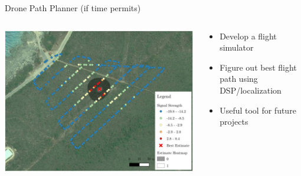 \begin{frame}{Drone Path Planner (if time permits)}
    \begin{columns}
        \begin{column}{0.5\textwidth}
            \includegraphics[height=0.7\textheight,width=\textwidth,keepaspectratio]{images/rtt/rob22017-fig-0005-m.jpg}
        \end{column}
        \begin{column}{0.5\textwidth}
            \begin{itemize}
                \item Develop a flight simulator
                \item Figure out best flight path using DSP/localization
                \item Useful tool for future projects
            \end{itemize}
        \end{column}
    \end{columns}
\end{frame}

